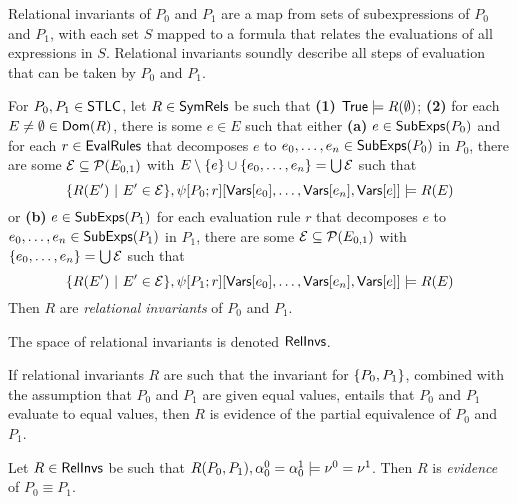 Relational invariants of $P_0$ and $P_1$ are a map from sets of
subexpressions of $P_0$ and $P_1$, with each set $S$ mapped to a
formula that relates the evaluations of all expressions in $S$.
%
Relational invariants soundly describe all steps of evaluation that
can be taken by $P_0$ and $P_1$.
\begin{defn}
  \label{defn:rel-invs}
  For $P_0, P_1 \in \mathsf{STLC}$, let $R \in \mathsf{SymRels}$ be such that %
  \textbf{(1)} $\mathsf{True} \models R(\emptyset)$;
  \textbf{(2)} for each $E \not= \emptyset \in \mathsf{Dom}(R)$, %
  there is some $e \in E$ such that either %
  \textbf{(a)} $e \in \mathsf{SubExps}(P_0)$ and for each $r \in
  \mathsf{EvalRules}$ that decomposes $e$ to $e_0, \ldots, e_n \in
  \mathsf{SubExps}(P_0)$ in $P_0$,
  there are some $\mathcal{E} \subseteq \mathcal{P}(E_{0, 1})$ with
  $E  \setminus \{  e  \} \cup \{  e_0, \ldots, e_n  \} = \bigcup
  \mathcal{E}$ such that
  \[ \setformer{ R(E') }{ E' \in \mathcal{E} }, %
  \subs{ \symstep{P_0}{ r } }{ %
    \vars[ e_0 ], \ldots, \vars[ e_n ], \vars[ e ] } %
  \entails R( E )
  \]
  or
  \textbf{(b)} $e \in \mathsf{SubExps}(P_1)$ for each evaluation rule $r$ that
  decomposes $e$
  to $e_0, \ldots, e_n \in \mathsf{SubExps}(P_1)$ in $P_1$,
  there are some $\mathcal{E} \subseteq \mathcal{P}(E_{0, 1})$ with $\{ 
    e_0, \ldots, e_n  \} = \bigcup \mathcal{E}$ such that
  \[ \setformer{ R(E') }{ E' \in \mathcal{E} }, %
  \subs{ \symstep{P_1}{ r } }{ %
    \vars[ e_0 ], \ldots, \vars[ e_n ], \vars[ e ] } %
  \entails R(E)
  \]
  Then $R$ are \emph{relational invariants} of $P_0$ and $P_1$.
\end{defn}
%
The space of relational invariants is denoted $\mathsf{RelInvs}$.

If relational invariants $R$ are such that the invariant for $\{ 
  P_0, P_1  \}$, combined with the assumption that $P_0$ and $P_1$ are
given equal values, entails that $P_0$ and $P_1$ evaluate to equal
values, then $R$ is evidence of the partial equivalence of $P_0$ and
$P_1$.
%
\begin{defn}
  \label{defn:eq-pf}
  Let $R \in \mathsf{RelInvs}$ be such that $R(P_0, P_1), \alpha^0_0 =
  \alpha^1_0 \models \nu^0 = \nu^1$.
  Then $R$ is \emph{evidence} of $P_0 \equiv P_1$.
\end{defn}

\begin{ex}
  \label{ex:rel-invs}
\end{ex}

